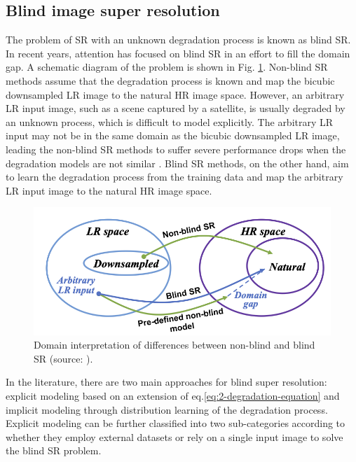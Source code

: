     \subsection{Blind image super resolution}

        The problem of SR with an unknown degradation process is known as blind SR. 
        In recent years, attention has focused on blind SR in an effort to fill the domain gap.    A schematic diagram of the problem is shown in Fig. \ref{fig:2-DomainGap}. 
        Non-blind SR methods assume that the degradation process is known and map the bicubic downsampled LR image to the natural HR image space.
        However, an arbitrary LR input image, such as a scene captured by a satellite, is usually degraded by an unknown process, which is difficult to model explicitly.
        The arbitrary LR input may not be in the same domain as the bicubic downsampled LR image, leading the non-blind SR methods to suffer severe performance drops when the degradation models are not similar \cite{accurateblurs2013}.
        Blind SR methods, on the other hand, aim to learn the degradation process from the training data and map the arbitrary LR input image to the natural HR image space.
        
        \begin{figure}[H]
            \centering
            \includegraphics[width=\textwidth]{Includes/2-DomainGap.png}
            \caption{Domain interpretation of differences between non-blind and blind SR (source: \cite{liu2021blind}).}
            \label{fig:2-DomainGap}
        \end{figure}

        In the literature, there are two main approaches for blind super resolution: 
        explicit modeling based on an extension of eq.\ref{eq:2-degradation-equation} and implicit modeling through distribution learning of the degradation process.
        Explicit modeling can be further classified into two sub-categories according to whether they employ external datasets or rely on a single input image to solve the blind SR problem.


